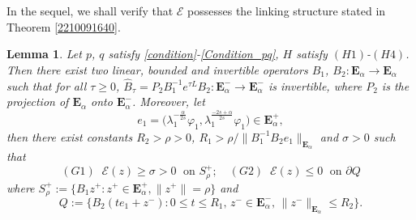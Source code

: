 \documentclass[10pt]{article}
\numberwithin{equation}{section}
\newtheorem{lemma}[theorem]{Lemma}
\numberwithin{equation}{section}
\begin{document}
In the sequel, we shall verify that $\mathcal{E}$ possesses the linking structure stated in Theorem \ref{2210091640}.
\begin{lemma}\label{2211161004}
Let $p$, $q$ satisfy \eqref{condition}-\eqref{Condition_pq}, $H$ satisfy $(H1)$-$(H4)$. Then there exist two linear, bounded and invertible operators $B_1$, $B_2: \mathbf{E}_{\alpha}\to \mathbf{E}_{\alpha}$ such that for all $\tau\ge 0$, $\widehat{B}_{\tau}=P_2 B_1^{-1}e^{\tau L}B_2 : \mathbf{E}_{\alpha}^-\to \mathbf{E}_{\alpha}^-$ is invertible, where $P_2$ is the projection of $\mathbf{E}_{\alpha}$ onto $\mathbf{E}_{\alpha}^-$. Moreover, let 
$$e_1=\Big(\lambda_1^{-\frac{\alpha}{2s}}\varphi_1, \lambda_1^{\frac{-2s+\alpha}{2s}}\varphi_1\Big)\in \mathbf{E}_{\alpha}^+,$$ 
then there exist constants $R_2>\rho>0$, $R_1>\rho/\|B_1^{-1}B_2 e_1\|_{\mathbf{E}_{\alpha}}$ and $\sigma>0$ such that
$$
(G1)\;\; \mathcal{E}(z)\ge \sigma>0  \;\mbox{ on } S_\rho^+; \quad (G2)\;\; \mathcal{E}(z)\le 0 \;\mbox{ on } \partial Q$$
where $S_\rho^+:=\{B_1z^+: z^+\in \mathbf{E}^+_{\alpha}, \|z^+\|=\rho\}$
and
\[
Q:=\big\{B_2(te_1+z^-): 0\le t\le R_1, \, z^-\in \mathbf{E}_{\alpha}^-,\,  \|z^-\|_{\mathbf{E}_{\alpha}}\le R_2\big\}.
\]
\end{lemma}
\end{document}
